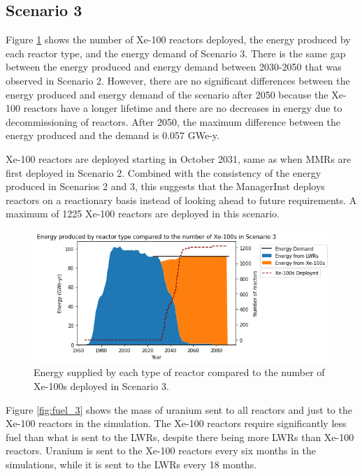 \subsection{Scenario 3}
Figure \ref{fig:energy_rx_3} shows the number of Xe-100 reactors deployed, 
the energy produced by each reactor type, and the energy demand of Scenario 3. 
There is the same gap between the energy produced and energy demand between 
2030-2050 that was observed in Scenario 2. However, there are no significant 
differences between the energy produced and energy demand of the scenario 
after 2050 because the Xe-100 reactors have a longer lifetime and there are 
no decreases in energy due to decommissioning of reactors. After 2050, the 
maximum difference between the energy produced and the demand is 0.057 GWe-y. 

Xe-100 reactors are deployed starting in October 2031, same as when \glspl{MMR}
are first deployed in Scenario 2. Combined with the consistency of the energy 
produced in Scenarios 2 and 3, this suggests that the \Cycamore ManagerInst 
deploys reactors on a reactionary basis instead of looking ahead to future 
requirements. A maximum of 1225 Xe-100 reactors are deployed in this scenario.

\begin{figure}
    \centering 
    \includegraphics[scale=0.5]{figures/energy_scenario3.png}
    \caption{Energy supplied by each type of reactor compared to the number of 
    Xe-100s deployed in Scenario 3.}
    \label{fig:energy_rx_3}
\end{figure}

Figure \ref{fig:fuel_3} shows the mass of uranium sent to all reactors and 
just to the Xe-100 reactors in the simulation. The Xe-100 reactors 
require significantly less fuel than what is sent to the \glspl{LWR}, 
despite there being more \glspl{LWR} than Xe-100 reactors. Uranium 
is sent to the Xe-100 reactors every six months in the simulations, 
while it is sent to the \glspl{LWR} every 18 months. 

